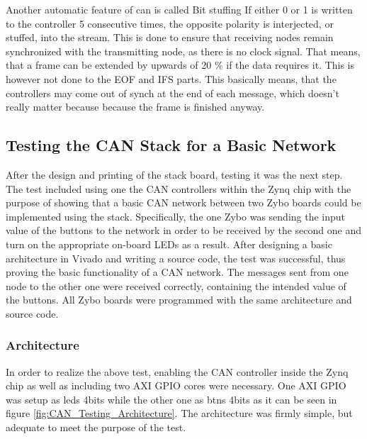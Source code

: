 Another automatic feature of can is called Bit stuffing
If either 0 or 1 is written to the controller 5 consecutive times, the opposite polarity is interjected, or stuffed, into the stream. 
This is done to ensure that receiving nodes remain synchronized with the transmitting node, as there is no clock signal.
That means, that a frame can be extended by upwards of 20 \% if the data requires it.
This is however not done to the EOF and IFS parts.
This basically means, that the controllers may come out of synch at the end of each message, which doesn't really matter because because the frame is finished anyway.


\subsection{Testing the CAN Stack for a Basic Network}
\label{sub:TestingCANStack_BareMetal}

After the design and printing of the stack board, testing it was the next step.
The test included using one the CAN controllers within the Zynq chip with the purpose of showing that a basic CAN network between two Zybo boards could be implemented using the stack.
Specifically, the one Zybo was sending the input value of the buttons to the network in order to be received by the second one and turn on the appropriate on-board LEDs as a result.
After designing a basic architecture in Vivado and writing a source code, the test was successful, thus proving the basic functionality of a CAN network.
The messages sent from one node to the other one were received correctly, containing the intended value of the buttons. 
All Zybo boards were programmed with the same architecture and source code.

\subsubsection{Architecture}
In order to realize the above test, enabling the CAN controller inside the Zynq chip as well as including two AXI GPIO cores were necessary.
One AXI GPIO was setup as leds 4bits while the other one as btns 4bits as it can be seen in figure \ref{fig:CAN_Testing_Architecture}. The architecture was firmly simple, but adequate to meet the purpose of the test.

